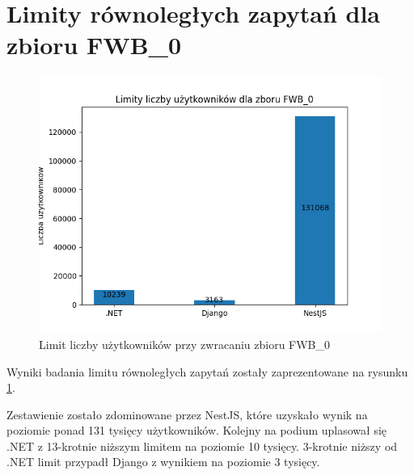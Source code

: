 \section{Limity równoległych zapytań dla zbioru FWB\_0}

\begin{figure}[!hb]
	\centering \includegraphics[width=1\linewidth]{rysunki/Limity_liczby_uzytkownikow_dla_zboru_FWB_0.png}
	\caption{Limit liczby użytkowników przy zwracaniu zbioru FWB\_0}
	\label{rys:limit_vus_fwb_0}
\end{figure}

Wyniki badania limitu równoległych zapytań zostały zaprezentowane na rysunku \ref{rys:limit_vus_fwb_0}.

Zestawienie zostało zdominowane przez NestJS, które uzyskało wynik na poziomie ponad 131 tysięcy użytkowników.
Kolejny na podium uplasował się .NET z 13-krotnie niższym limitem na poziomie 10 tysięcy.
3-krotnie niższy od .NET limit przypadł Django z wynikiem na poziomie 3 tysięcy.
